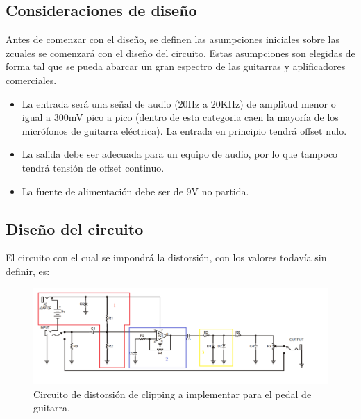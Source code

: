 \documentclass[../../main.tex]{subfiles}
\begin{document}
\subsection{Consideraciones de dise\~no} \label{ssec:ej5_consideraciones_disenio}
Antes de comenzar con el diseño, se definen las asumpciones iniciales sobre las zcuales se comenzará con el diseño del circuito. Estas asumpciones son elegidas de forma tal que se pueda abarcar un gran espectro de las guitarras y aplificadores comerciales.\par
\begin{itemize}
	\item La entrada ser\'a una señal de audio (20Hz a 20KHz) de amplitud menor o igual a 300mV pico a pico (dentro de esta categoria caen la mayor\'ia de los micr\'ofonos de guitarra el\'ectrica). La entrada en principio tendrá offset nulo.
	\item La salida debe ser adecuada para un equipo de audio, por lo que tampoco tendrá tensión de offset continuo.
	\item La fuente de alimentaci\'on debe ser de 9V no partida.
\end{itemize}


\subsection{Dise\~no del circuito}
\label{disenoCirc}
El circuito con el cual se impondrá la distorsión, con los valores todavía sin definir, es:

\begin{figure}[H]	%
	\centering
	\includegraphics[scale=0.6]{imagenes/Circuito_consigna.png}
	\caption{Circuito de distorsión de clipping a implementar para el pedal de guitarra.}
	\label{fig:ej5_Circuito_consigna}
\end{figure}
\end{document}

